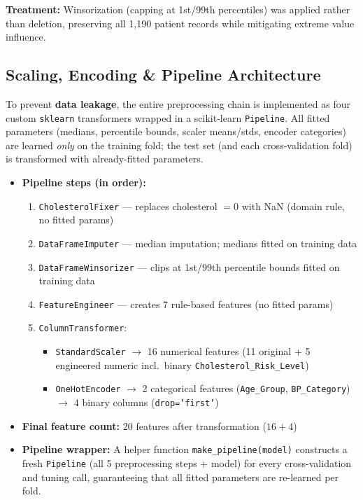 \documentclass[12pt,a4paper]{article}
\begin{document}
\textbf{Treatment:} Winsorization (capping at 1st/99th percentiles) was applied rather than deletion, preserving all 1,190 patient records while mitigating extreme value influence.

\subsection{Scaling, Encoding \& Pipeline Architecture}

To prevent \textbf{data leakage}, the entire preprocessing chain is implemented as four custom \texttt{sklearn} transformers wrapped in a scikit-learn \texttt{Pipeline}.  All fitted parameters (medians, percentile bounds, scaler means/stds, encoder categories) are learned \emph{only} on the training fold; the test set (and each cross-validation fold) is transformed with already-fitted parameters.

\begin{itemize}
    \item \textbf{Pipeline steps (in order):}
    \begin{enumerate}
        \item \texttt{CholesterolFixer} --- replaces cholesterol $= 0$ with NaN (domain rule, no fitted params)
        \item \texttt{DataFrameImputer} --- median imputation; medians fitted on training data
        \item \texttt{DataFrameWinsorizer} --- clips at 1st/99th percentile bounds fitted on training data
        \item \texttt{FeatureEngineer} --- creates 7 rule-based features (no fitted params)
        \item \texttt{ColumnTransformer}:
        \begin{itemize}
            \item \texttt{StandardScaler} $\rightarrow$ 16 numerical features (11 original + 5 engineered numeric incl.\ binary \texttt{Cholesterol\_Risk\_Level})
            \item \texttt{OneHotEncoder} $\rightarrow$ 2 categorical features (\texttt{Age\_Group}, \texttt{BP\_Category}) $\rightarrow$ 4 binary columns (\texttt{drop='first'})
        \end{itemize}
    \end{enumerate}
    \item \textbf{Final feature count:} 20 features after transformation ($16 + 4$)
    \item \textbf{Pipeline wrapper:} A helper function \texttt{make\_pipeline(model)} constructs a fresh \texttt{Pipeline} (all 5 preprocessing steps + model) for every cross-validation and tuning call, guaranteeing that all fitted parameters are re-learned per fold.
\end{itemize}
\end{document}
